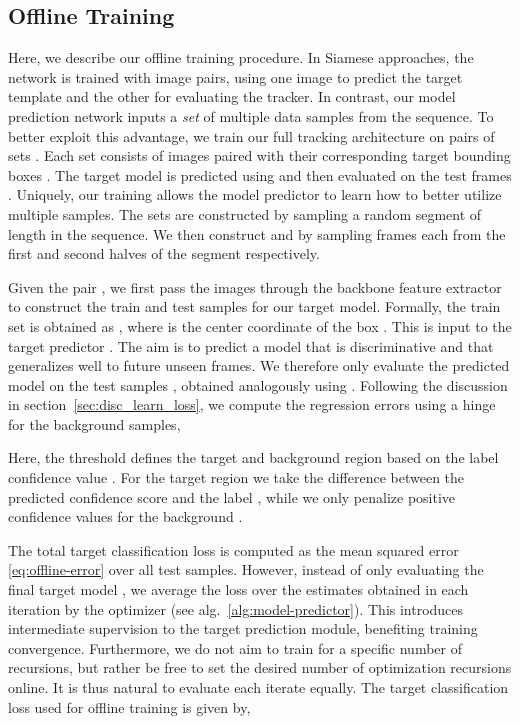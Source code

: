 \documentclass[10pt,twocolumn,letterpaper]{article}
\begin{document}
\subsection{Offline Training}
\label{sec:offline_training}
Here, we describe our offline training procedure. In Siamese approaches, the network is trained with image pairs, using one image to predict the target template and the other for evaluating the tracker. In contrast, our model prediction network  inputs a \emph{set}  of multiple data samples from the sequence. To better exploit this advantage, we train our full tracking architecture on pairs of sets . Each set  consists of images  paired with their corresponding target bounding boxes . The target model is predicted using  and then evaluated on the test frames . Uniquely, our training allows the model predictor  to learn how to better utilize multiple samples. The sets are constructed by sampling a random segment of length  in the sequence. We then construct  and   by sampling  frames each from the first and second halves of the segment respectively.

Given the pair , we first pass the images through the backbone feature extractor to construct the train  and test  samples for our target model. Formally, the train set is obtained as , where  is the center coordinate of the box . This is input to the target predictor . The aim is to predict a model  that is discriminative and that generalizes well to future unseen frames. We therefore only evaluate the predicted model  on the test samples , obtained analogously using . Following the discussion in section~\ref{sec:disc_learn_loss}, we compute the regression errors using a hinge for the background samples,

Here, the threshold  defines the target and background region based on the label confidence value . For the target region  we take the difference between the predicted confidence score  and the label , while we only penalize positive confidence values for the background .

The total target classification loss is computed as the mean squared error \eqref{eq:offline-error} over all test samples. However, instead of only evaluating the final target model , we average the loss over the estimates  obtained in each iteration  by the optimizer (see alg.~\ref{alg:model-predictor}). This introduces intermediate supervision to the target prediction module, benefiting training convergence. Furthermore, we do not aim to train for a specific number of recursions, but rather be free to set the desired number of optimization recursions online. It is thus natural to evaluate each iterate  equally. The target classification loss used for offline training is given by,
\end{document}
